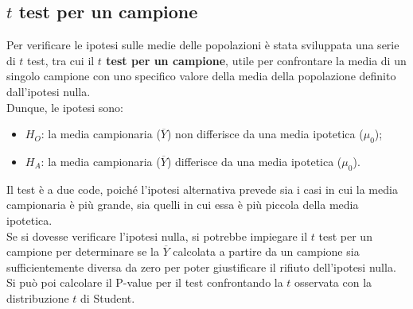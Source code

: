 \documentclass[10pt, draft]{book}
\begin{document}
\subsection{\texorpdfstring{$t$}{Lg} test per un campione}
Per verificare le ipotesi sulle medie delle popolazioni è stata sviluppata una serie di $t$ test, tra cui il \textbf{$t$ test per un campione}, utile per confrontare la media di un singolo campione con uno specifico valore della media della popolazione definito dall'ipotesi nulla.
\\
Dunque, le ipotesi sono:
\begin{itemize}
    \item $H_O$: la media campionaria ($\overline{Y}$) non differisce da una media ipotetica ($\mu_0$);
    \item $H_A$: la media campionaria ($\overline{Y}$) differisce da una media ipotetica ($\mu_0$).
\end{itemize}
Il test è a due code, poiché l'ipotesi alternativa prevede sia i casi in cui la media campionaria è più grande, sia quelli in cui essa è più piccola della media ipotetica.
\\
Se si dovesse verificare l'ipotesi nulla, si potrebbe impiegare il $t$ test per un campione per determinare se la $\overline{Y}$ calcolata a partire da un campione sia sufficientemente diversa da zero per poter giustificare il rifiuto dell'ipotesi nulla.
\\
Si può poi calcolare il P-value per il test confrontando la $t$ osservata con la distribuzione $t$ di Student.
\end{document}
